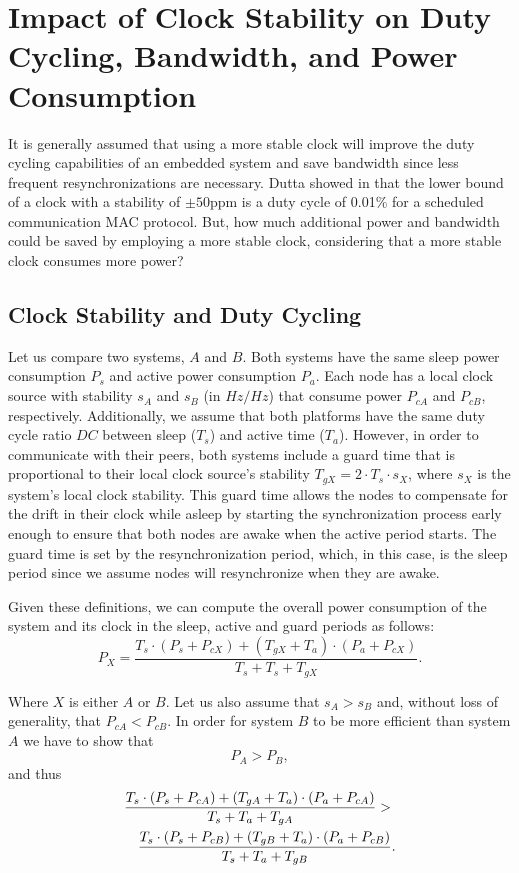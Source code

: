 \section{Impact of Clock Stability on Duty Cycling, Bandwidth, and Power Consumption}
\label{sec:power}

It is generally assumed that using a more stable clock will improve the duty
cycling capabilities of an embedded system and save bandwidth since less 
frequent resynchronizations are necessary. Dutta
showed in \cite{dutta2007procrastination} that the lower bound of a clock with
a stability of $\pm 50$ppm is a duty cycle of 0.01\% for a scheduled
communication MAC protocol. But, how much additional power and bandwidth could be saved by
employing a more stable clock, considering that a more stable clock consumes
more power? 

\subsection{Clock Stability and Duty Cycling}
Let us compare two systems, $A$ and $B$. Both systems have the same sleep power
consumption $P_s$ and active power consumption $P_a$.  Each node has a local
clock source with stability $s_A$ and $s_B$ (in $Hz/Hz$) that consume power $P_{cA}$ and $P_{cB}$,
respectively. Additionally, we assume that both platforms have the same duty
cycle ratio $DC$ between sleep ($T_s$) and active time ($T_a$). However, in order
to communicate with their peers, both systems include a guard time that is
proportional to their local clock source's stability $T_{gX} = 2 \cdot T_s \cdot
s_X$, where $s_X$ is the system's local clock stability. This guard time
allows the nodes to compensate for the drift in their clock while asleep by starting 
the synchronization process early enough to ensure that both nodes are awake when 
the active period starts. The guard time is set by the resynchronization period, which,
 in this case, is the sleep period since we assume nodes will resynchronize when 
they are awake.

Given these definitions, we can compute the overall power consumption of the
system and its clock in the sleep, active and guard periods as follows:
\begin{equation}
	P_X = \frac{T_s \cdot (P_s + P_{cX}) + (T_{gX} + T_a) \cdot (P_a + P_{cX})}{T_s + T_s + T_{gX}}.
\end{equation}

Where $X$ is either $A$ or $B$. Let us also assume that $s_A > s_B$ and, without loss 
of generality, that $P_{cA} < P_{cB}$. In order for system $B$ to be more efficient 
than system $A$ we have to show that
\begin{equation}
	P_A > P_B,
\end{equation}
and thus
\begin{eqnarray}
	\lefteqn{\frac{T_s \cdot (P_s + P_{cA}) + (T_{gA} + T_a) \cdot (P_a + P_{cA})}{T_s + T_a + T_{gA}}  > } \nonumber \\
	& & \frac{T_s \cdot (P_s + P_{cB}) + (T_{gB} + T_a) \cdot (P_a +
	P_{cB})}{T_s + T_a + T_{gB}}.\label{eq:1}
\end{eqnarray}

